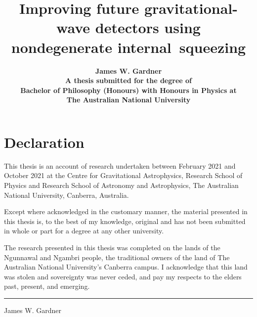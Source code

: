 \documentclass[onecolumn,12pt,a4paper,openany,oneside]{book}
\begin{document}

\begin{titlepage}
\title{\textbf{Improving future gravitational-wave detectors using nondegenerate internal~squeezing}\\[2cm]}
\author{\textbf{James W. Gardner}\\[6cm]
\textbf{A thesis submitted for the degree of}\\
\textbf{Bachelor of Philosophy (Honours) with Honours in Physics at} \\
\textbf{The Australian National University}\\[1cm]}
\date{\textbf{\thismonth}}
\maketitle
\end{titlepage}
 
\sloppy


\chapter*{Declaration}

This thesis is an account of research undertaken between February 2021 and October 2021 at the Centre for Gravitational Astrophysics, Research School of Physics and Research School of Astronomy and Astrophysics, The Australian National University, Canberra, Australia.

Except where acknowledged in the customary manner, the material presented in this thesis is, to the best of my knowledge, original and has not been submitted in whole or part for a degree at any other university.

The research presented in this thesis was completed on the lands of the Ngunnawal and Ngambri people, the traditional owners of the land of The Australian National University's Canberra campus. I acknowledge that this land was stolen and sovereignty was never ceded, and pay my respects to the elders past, present, and emerging. %

\vspace{20mm}
\hspace{80mm}\rule{40mm}{.15mm}\par
\hspace{80mm} James W. Gardner\par
\hspace{80mm} \thismonth
\end{document}
